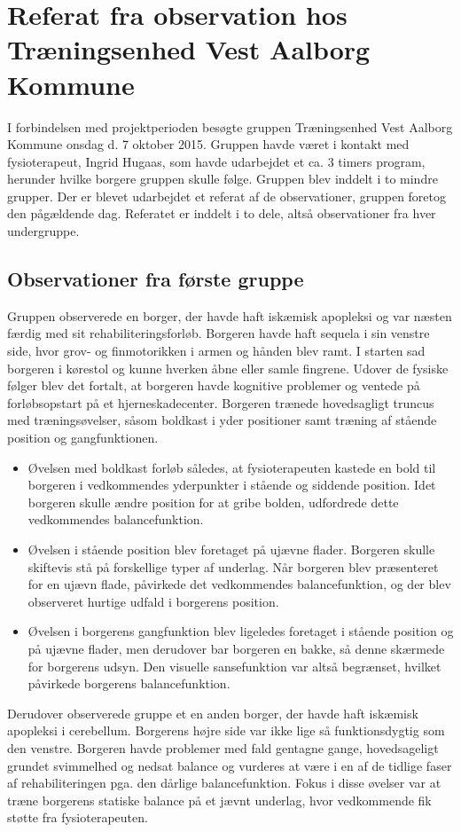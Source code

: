 \chapter{Referat fra observation hos Træningsenhed Vest Aalborg Kommune}\label{Ref_observation}
I forbindelsen med projektperioden besøgte gruppen Træningsenhed Vest Aalborg Kommune onsdag d. 7 oktober 2015. Gruppen havde været i kontakt med fysioterapeut, Ingrid Hugaas, som havde udarbejdet et ca. 3 timers program, herunder hvilke borgere gruppen skulle følge. Gruppen blev inddelt i to mindre grupper. Der er blevet udarbejdet et referat af de observationer, gruppen foretog den pågældende dag. Referatet er inddelt i to dele, altså observationer fra hver undergruppe. 

\section{Observationer fra første gruppe}
Gruppen observerede en borger, der havde haft iskæmisk apopleksi og var næsten færdig med sit rehabiliteringsforløb. Borgeren havde haft sequela  i sin venstre side, hvor grov- og finmotorikken i armen og hånden blev ramt. I starten sad borgeren i kørestol og kunne hverken åbne eller samle fingrene. Udover de fysiske følger blev det fortalt, at borgeren havde kognitive problemer og ventede på forløbsopstart på et hjerneskadecenter. Borgeren trænede hovedsagligt truncus med træningsøvelser, såsom boldkast i yder positioner samt træning af stående position og gangfunktionen. 
\begin{itemize}
\item Øvelsen med boldkast forløb således, at fysioterapeuten kastede en bold til borgeren i vedkommendes yderpunkter i stående og siddende position. Idet borgeren skulle ændre position for at gribe bolden, udfordrede dette vedkommendes balancefunktion. 
\item Øvelsen i stående position blev foretaget på ujævne flader. Borgeren skulle skiftevis stå på forskellige typer af underlag. Når borgeren blev præsenteret for en ujævn flade, påvirkede det vedkommendes balancefunktion, og der blev observeret hurtige udfald i borgerens position. 
\item Øvelsen i borgerens gangfunktion blev ligeledes foretaget i stående position og på ujævne flader, men derudover bar borgeren en bakke, så denne skærmede for borgerens udsyn. Den visuelle sansefunktion var altså begrænset, hvilket påvirkede borgerens balancefunktion. 
\end{itemize}
\noindent Derudover observerede gruppe et en anden borger, der havde haft iskæmisk apopleksi i cerebellum. Borgerens højre side var ikke lige så funktionsdygtig som den venstre. Borgeren havde problemer med fald gentagne gange, hovedsageligt grundet svimmelhed og nedsat balance og vurderes at være i en af de tidlige faser af rehabiliteringen pga. den dårlige balancefunktion. Fokus i disse øvelser var at træne borgerens statiske balance på et jævnt underlag, hvor vedkommende fik støtte fra fysioterapeuten. 

